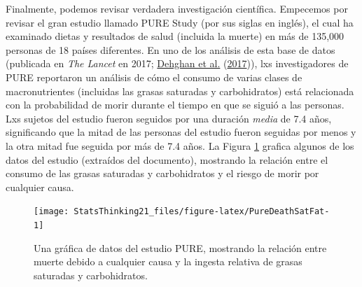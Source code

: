 \documentclass[
  12pt,
]{book}
\theoremstyle{definition}
\theoremstyle{definition}
\theoremstyle{definition}
\theoremstyle{remark}
\begin{document}
Finalmente, podemos revisar verdadera investigación científica. Empecemos por revisar el gran estudio llamado PURE Study (por sus siglas en inglés), el cual ha examinado dietas y resultados de salud (incluida la muerte) en más de 135,000 personas de 18 países diferentes. En uno de los análisis de esta base de datos (publicada en \emph{The Lancet} en 2017; \protect\hyperlink{ref-dehg:ment:zhan:2017}{Dehghan et al.} (\protect\hyperlink{ref-dehg:ment:zhan:2017}{2017})), lxs investigadores de PURE reportaron un análisis de cómo el consumo de varias clases de macronutrientes (incluidas las grasas saturadas y carbohidratos) está relacionada con la probabilidad de morir durante el tiempo en que se siguió a las personas. Lxs sujetos del estudio fueron seguidos por una duración \emph{media} de 7.4 años, significando que la mitad de las personas del estudio fueron seguidas por menos y la otra mitad fue seguida por más de 7.4 años. La Figura \ref{fig:PureDeathSatFat} grafica algunos de los datos del estudio (extraídos del documento), mostrando la relación entre el consumo de las grasas saturadas y carbohidratos y el riesgo de morir por cualquier causa.

\begin{figure}
\texttt{[image: StatsThinking21\_files/figure-latex/PureDeathSatFat-1]} \caption{Una gráfica de datos del estudio PURE, mostrando la relación entre muerte debido a cualquier causa y la ingesta relativa de grasas saturadas y carbohidratos.}\label{fig:PureDeathSatFat}
\end{figure}
\end{document}
